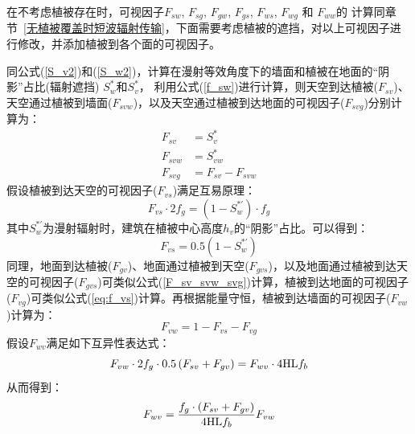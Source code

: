 在不考虑植被存在时，可视因子$F_{sw}$, $F_{sg}$, $F_{gw}$, $F_{gs}$, $F_{ws}$, $F_{wg}$ 和 $F_{ww}$的
计算同章节~\ref{无植被覆盖时短波辐射传输}，下面需要考虑植被的遮挡，对以上可视因子进行修改，并添加植被到各个面的可视因子。

同公式(\ref{S_v2})和(\ref{S_w2})，计算在漫射等效角度下的墙面和植被在地面的“阴影”占比(辐射遮挡) $S_w^\ast$和$S_v^\ast$，
利用公式(\ref{f_sw})进行计算，则天空到达植被($F_{sv}$)、天空通过植被到墙面($F_{svw}$)，以及天空通过植被到达地面的可视因子($F_{svg}$)分别计算为：
\begin{equation}\label{F_sv_svw_svg}
\begin{aligned}F_{s v} &=S_{v}^{*} \\ F_{s v w} &=S_{v w}^{*} \\ F_{s v g} &=F_{s v}-F_{s v w}\end{aligned}
\end{equation}
假设植被到达天空的可视因子($F_{vs}$)满足互易原理：
\begin{equation}
F_{vs}\cdot 2f_g = \left( 1-S_w ^{*\prime} \right ) \cdot f_g
\end{equation}
其中$S_w ^{*\prime}$为漫射辐射时，建筑在植被中心高度$h_v$的“阴影”占比。可以得到：
\begin{equation}\label{eq:f_vs}
F_{vs} = 0.5 \left( 1-S_w ^{*\prime} \right )
\end{equation}
同理，地面到达植被($F_{gv}$)、地面通过植被到天空($F_{gvs}$)，以及地面通过植被到达天空的可视因子($F_{gvs}$)可类似公式(\ref{F_sv_svw_svg})计算，植被到达地面的可视因子($F_{vg}$)可类似公式(\ref{eq:f_vs})计算。再根据能量守恒，植被到达墙面的可视因子($F_{vw}$)计算为：
\begin{equation}
F_{v w}=1-F_{v s}-F_{v g}
\end{equation}
假设$F_{wv}$满足如下互异性表达式：
\begin{equation}
F_{vw}\cdot 2f_g \cdot 0.5\left( F_{sv}+F_{gv} \right ) = F_{wv} \cdot 4 {\rm HL} f_b 
\end{equation}
从而得到：
\begin{equation}
F_{wv}=\frac{f_g \cdot \left( F_{sv}+F_{gv} \right )} {4 {\rm HL}f_b} F_{vw}
\end{equation}
